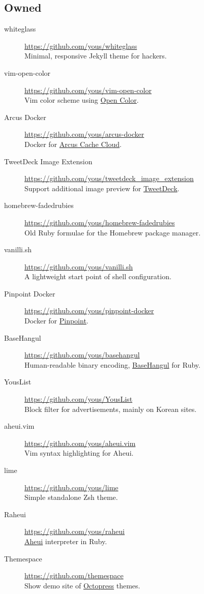 \documentclass[a4paper,10pt]{article}
\begin{document}
\subsection{Owned}
\begin{description}
  \item[whiteglass] \url{https://github.com/yous/whiteglass} \\
    Minimal, responsive Jekyll theme for hackers.
  \item[vim-open-color] \url{https://github.com/yous/vim-open-color} \\
    Vim color scheme using \href{https://yeun.github.io/open-color/}{Open Color}.
  \item[Arcus Docker] \url{https://github.com/yous/arcus-docker} \\
    Docker for \href{https://github.com/naver/arcus}{Arcus Cache Cloud}.
  \item[TweetDeck Image Extension] \url{https://github.com/yous/tweetdeck_image_extension} \\
    Support additional image preview for \href{https://tweetdeck.twitter.com}{TweetDeck}.
  \item[homebrew-fadedrubies] \url{https://github.com/yous/homebrew-fadedrubies} \\
    Old Ruby formulae for the Homebrew package manager.
  \item[vanilli.sh] \url{https://github.com/yous/vanilli.sh} \\
    A lightweight start point of shell configuration.
  \item[Pinpoint Docker] \url{https://github.com/yous/pinpoint-docker} \\
    Docker for \href{https://github.com/naver/pinpoint}{Pinpoint}.
  \item[BaseHangul] \url{https://github.com/yous/basehangul} \\
    Human-readable binary encoding, \href{https://basehangul.github.io}{BaseHangul} for Ruby.
  \item[YousList] \url{https://github.com/yous/YousList} \\
    Block filter for advertisements, mainly on Korean sites.
  \item[aheui.vim] \url{https://github.com/yous/aheui.vim} \\
    Vim syntax highlighting for Aheui.
  \item[lime] \url{https://github.com/yous/lime} \\
    Simple standalone Zsh theme.
  \item[Raheui] \url{https://github.com/yous/raheui} \\
    \href{http://aheui.github.io}{Aheui} interpreter in Ruby.
  \item[Themespace] \url{https://github.com/themespace} \\
    Show demo site of \href{http://octopress.org}{Octopress} themes.
\end{description}
\end{document}
